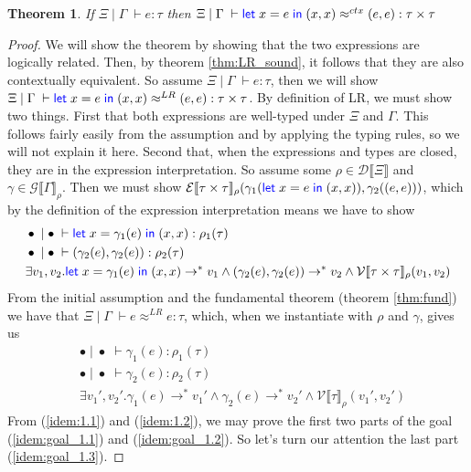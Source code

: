 \documentclass[twoside,11pt,openright]{report}
\newtheorem{theorem}{Theorem}
\theoremstyle{definition}
\newcommand{\var}{x}
\newcommand{\expr}{e}
\newcommand{\val}{v}
\newcommand{\Tprod}[2]{#1 \times #2}
\newcommand{\typ}{\tau}
\newcommand{\venv}{\Gamma}
\newcommand{\tenv}{\Xi}
\newcommand{\emptenv}{\bullet}
\newcommand{\empvenv}{\bullet}
\newcommand{\jdg}[4]{#1 \; | \; #2 \; \vdash #3 : #4}
\newcommand{\jdgRel}[6]{#1 \; | \; #2 \; \vdash #3 \approx^{#4} #5 : #6}
\newcommand{\ctxRel}[5]{\jdgRel{#1}{#2}{#3}{ctx}{#4}{#5}}
\newcommand{\stepS}{\rightarrow^*}
\newcommand{\ValInp}[2]{\mathcal{V} \llbracket #1 \rrbracket_{#2}}
\newcommand{\ValInpGen}[2]{\ValInp{#1}{#2}(\val_1, \val_2)}
\newcommand{\ExpInp}[2]{\mathcal{E} \llbracket #1 \rrbracket_{#2}}
\newcommand{\VenvInp}[2]{\mathcal{G} \llbracket #1 \rrbracket_{#2}}
\newcommand{\TenvInp}[1]{\mathcal{D} \llbracket #1 \rrbracket}
\newcommand{\LogRel}[5]{\jdgRel{#1}{#2}{#3}{LR}{#4}{#5}}
\begin{document}
\begin{theorem}
  If $\jdg{\tenv}{\venv}{\expr}{\typ}$ then $\ctxRel{\tenv}{\venv}{\Let \var = \expr in (\var, \var)}{(\expr, \expr)}{\Tprod{\typ}{\typ}}$
\end{theorem}
\begin{proof}
  We will show the theorem by showing that the two expressions are logically related. Then, by theorem \ref{thm:LR_sound}, it follows that they are also contextually equivalent. So assume $\jdg{\tenv}{\venv}{\expr}{\typ}$, then we will show $\LogRel{\tenv}{\venv}{\Let \var = \expr in (\var, \var)}{(\expr, \expr)}{\Tprod{\typ}{\typ}}$. By definition of LR, we must show two things. First that both expressions are well-typed under $\tenv$ and $\venv$. This follows fairly easily from the assumption and by applying the typing rules, so we will not explain it here. Second that, when the expressions and types are closed, they are in the expression interpretation. So assume some $\rho \in \TenvInp{\tenv}$ and $\gamma \in \VenvInp{\venv}{\rho}$. Then we must show $\ExpInp{\Tprod{\typ}{\typ}}{\rho}(\gamma_1(\Let \var = \expr in (\var, \var)), \gamma_2((\expr, \expr)))$, which by the definition of the expression interpretation means we have to show
  \begin{align}
    &\jdg{\emptenv}{\empvenv}{\Let \var = \gamma_1(\expr) in (\var, \var)}{\rho_1(\typ)}\label{idem:goal_1.1}\\
    &\jdg{\emptenv}{\empvenv}{(\gamma_2(\expr), \gamma_2(\expr))}{\rho_2(\typ)}\label{idem:goal_1.2}\\
    &\exists \val_1, \val_2 . \Let \var = \gamma_1(\expr) in (\var, \var) \stepS \val_1 \land (\gamma_2(\expr), \gamma_2(\expr)) \stepS \val_2 \land\ValInpGen{\Tprod{\typ}{\typ}}{\rho}\label{idem:goal_1.3}
  \end{align}
  From the initial assumption and the fundamental theorem (theorem \ref{thm:fund}) we have that $\LogRel{\tenv}{\venv}{\expr}{\expr}{\typ}$, which, when we instantiate with $\rho$ and $\gamma$, gives us 
  \begin{align}
    &\jdg{\emptenv}{\empvenv}{\gamma_1(\expr)}{\rho_1(\typ)}\label{idem:1.1}\\
    &\jdg{\emptenv}{\empvenv}{\gamma_2(\expr)}{\rho_2(\typ)}\label{idem:1.2}\\
    &\exists \val_1', \val_2' . \gamma_1(\expr) \stepS \val_1' \land \gamma_2(\expr) \stepS \val_2' \land\ValInp{\typ}{\rho}(\val_1', \val_2')\label{idem:1.3}
  \end{align}
  From (\ref*{idem:1.1}) and (\ref*{idem:1.2}), we may prove the first two parts of the goal (\ref*{idem:goal_1.1}) and (\ref*{idem:goal_1.2}). So let's turn our attention the last part (\ref*{idem:goal_1.3}).

\end{proof}
\end{document}
